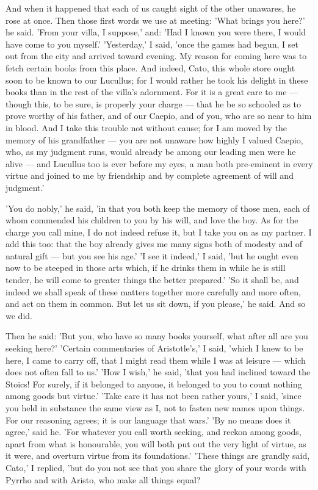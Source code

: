  And when it happened that each of us caught sight of the other unawares, he rose at once. Then those first words we use at meeting: 'What brings you here?' he said. 'From your villa, I suppose,' and: 'Had I known you were there, I would have come to you myself.' 'Yesterday,' I said, 'once the games had begun, I set out from the city and arrived toward evening. My reason for coming here was to fetch certain books from this place. And indeed, Cato, this whole store ought soon to be known to our Lucullus; for I would rather he took his delight in these books than in the rest of the villa's adornment. For it is a great care to me — though this, to be sure, is properly your charge — that he be so schooled as to prove worthy of his father, and of our Caepio, and of you, who are so near to him in blood. And I take this trouble not without cause; for I am moved by the memory of his grandfather — you are not unaware how highly I valued Caepio, who, as my judgment runs, would already be among our leading men were he alive — and Lucullus too is ever before my eyes, a man both pre-eminent in every virtue and joined to me by friendship and by complete agreement of will and judgment.'

 'You do nobly,' he said, 'in that you both keep the memory of those men, each of whom commended his children to you by his will, and love the boy. As for the charge you call mine, I do not indeed refuse it, but I take you on as my partner. I add this too: that the boy already gives me many signs both of modesty and of natural gift — but you see his age.' 'I see it indeed,' I said, 'but he ought even now to be steeped in those arts which, if he drinks them in while he is still tender, he will come to greater things the better prepared.' 'So it shall be, and indeed we shall speak of these matters together more carefully and more often, and act on them in common. But let us sit down, if you please,' he said. And so we did.

 Then he said: 'But you, who have so many books yourself, what after all are you seeking here?' 'Certain commentaries of Aristotle's,' I said, 'which I knew to be here, I came to carry off, that I might read them while I was at leisure — which does not often fall to us.' 'How I wish,' he said, 'that you had inclined toward the Stoics! For surely, if it belonged to anyone, it belonged to you to count nothing among goods but virtue.' 'Take care it has not been rather yours,' I said, 'since you held in substance the same view as I, not to fasten new names upon things. For our reasoning agrees; it is our language that wars.' 'By no means does it agree,' said he. 'For whatever you call worth seeking, and reckon among goods, apart from what is honourable, you will both put out the very light of virtue, as it were, and overturn virtue from its foundations.' 'These things are grandly said, Cato,' I replied, 'but do you not see that you share the glory of your words with Pyrrho and with Aristo, who make all things equal?

